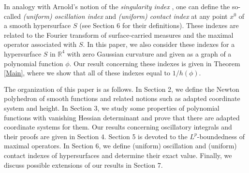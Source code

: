 \documentclass[a4paper, 11pt]{article}
\theoremstyle{plain}
\theoremstyle{definition}
\theoremstyle{lemma}
\theoremstyle{Remark}
\theoremstyle{proposition}
\theoremstyle{corollary}
\theoremstyle{example}
\theoremstyle{assumption}
\begin{document}
  In analogy with
Arnold's notion of the \emph{singularity index}   \cite{Ar,agvMN82},  one can define the so-called \textit{(uniform) oscillation index} and  \textit{(uniform) contact index} at  any point $x^0$ of  a smooth hypersurface $S$ (see Section 6 for their definitions).  These indexes are related to  the  Fourier transform of surface-carried measures and the maximal operator associated with $S$. In this paper, we also consider these indexes for a hypersurface $S$ in $\mathbb{R}^4$ with zero Gaussian curvature and given as  a graph of  a polynomial function $\phi$.
 Our result concerning these indexes is given in Theorem \ref{Main}, where we show that all of these indexes equal to  $1/h(\phi).$



The organization of this paper is as follows. In Section 2, we define the Newton polyhedron of  smooth functions and related notions such as adapted coordinate system and height. In Section 3,  we study some properties of polynomial functions with vanishing Hessian determinant and prove that there are   adapted coordinate systems  for them.  Our  results concerning   oscillatory integrals and their proofs  are given in Section 4.  Section 5 is devoted  to the $L^p$-boundedness of maximal operators.  In Section 6,  we define (uniform) oscillation and  (uniform) contact indexes of hypersurfaces and determine their exact value. Finally, we discuss possible extensions of our results in Section 7.
\end{document}
